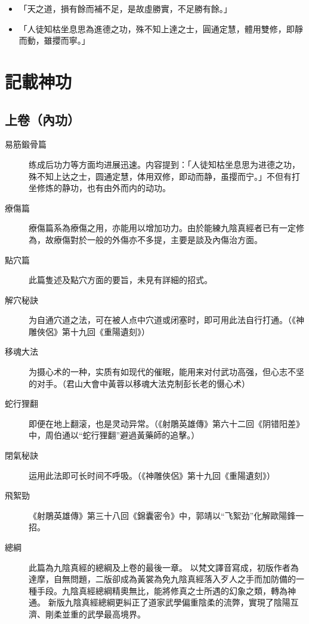 \begin{itemize}
\item 「天之道，損有餘而補不足，是故虛勝實，不足勝有餘。」
\item 「人徒知枯坐息思為進德之功，殊不知上達之士，圓通定慧，體用雙修，即靜而動，雖攖而寧。」
\end{itemize}

\section{記載神功}

\subsection{上卷（內功）}
\begin{description}
\item[易筋鍛骨篇] 练成后功力等方面均进展迅速。内容提到：「人徒知枯坐息思为进德之功，殊不知上达之士，圆通定慧，体用双修，即动而静，虽撄而宁。」不但有打坐修炼的静功，也有由外而内的动功。
\item[療傷篇] 療傷篇系為療傷之用，亦能用以增加功力。由於能練九陰真經者已有一定修為，故療傷對於一般的外傷亦不多提，主要是談及內傷治方面。
\item[點穴篇] 此篇隻述及點穴方面的要旨，未見有詳細的招式。
\item[解穴秘訣] 为自通穴道之法，可在被人点中穴道或闭塞时，即可用此法自行打通。（《神雕俠侶》第十九回《重陽遺刻》）
\item[移魂大法] 为摄心术的一种，实质有如现代的催眠，能用来对付武功高强，但心志不坚的对手。（君山大會中黃蓉以移魂大法克制彭长老的慑心术）
\item[蛇行狸翻] 即便在地上翻滚，也是灵动异常。（《射鵰英雄傳》第六十二回《阴错阳差》中，周伯通以“蛇行狸翻”避過黃藥師的追擊。）
\item[閉氣秘訣] 运用此法即可长时间不呼吸。（《神雕俠侶》第十九回《重陽遺刻》）
\item[飛絮勁] 《射鵰英雄傳》第三十八回《錦囊密令》中，郭靖以“飞絮劲”化解歐陽鋒一招。
\item[總綱] 此篇為九陰真經的總綱及上卷的最後一章。
以梵文譯音寫成，初版作者為達摩，自無問題，二版卻成為黃裳為免九陰真經落入歹人之手而加防備的一種手段。九陰真經總綱精奧無比，能將修真之士所遇的幻象之類，轉為神通。
新版九陰真經總綱更糾正了道家武學偏重陰柔的流弊，實現了陰陽互濟、剛柔並重的武學最高境界。  
\end{description}
